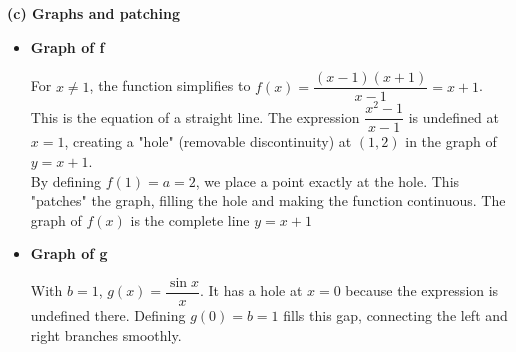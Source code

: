 \textbf{(c) Graphs and patching}
\begin{itemize}
    \item \textbf{Graph of f}
    \begin{center}
    \end{center}
    For $x \neq 1$, the function simplifies to $f(x)=\dfrac{(x-1)(x+1)}{x-1} = x+1$. This is the equation of a straight line. The expression $\dfrac{x^2-1}{x-1}$ is undefined at $x = 1$, creating a "hole" (removable discontinuity) at $(1,2)$ in the graph of $y=x+1$. \\
    By defining $f(1)=a=2$, we place a point exactly at the hole. This "patches" the graph, filling the hole and making the function continuous. The graph of $f(x)$ is the complete line $y=x+1$
    \item \textbf{Graph of g}
    \begin{center}
    \end{center}
    With $b=1$, $g(x) = \dfrac{\sin x}{x}$. It has a hole at $x=0$ because the expression is undefined there. Defining $g(0)=b=1$ fills this gap, connecting the left and right branches smoothly.
\end{itemize}

